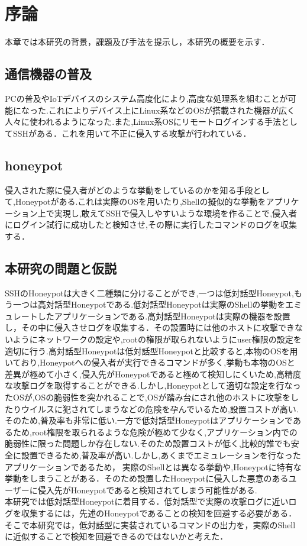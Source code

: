 \chapter{序論}
\label{intr}

本章では本研究の背景，課題及び手法を提示し，本研究の概要を示す．

\section{通信機器の普及}
\label{intr:back}
PCの普及やIoTデバイスのシステム高度化により,高度な処理系を組むことが可能になった.これによりデバイス上にLinux系などのOSが搭載された機器が広く人々に使われるようになった.また,Linux系OSにリモートログインする手法としてSSHがある．これを用いて不正に侵入する攻撃が行われている．

\section{honeypot}
\label{intr:honey}
 侵入された際に侵入者がどのような挙動をしているのかを知る手段として,Honeypotがある.これは実際のOSを用いたり,Shellの擬似的な挙動をアプリケーション上で実現し,敢えてSSHで侵入しやすいような環境を作ることで,侵入者にログイン試行に成功したと検知させ,その際に実行したコマンドのログを収集する．

 \section{本研究の問題と仮説}
 \label{intr:prob}
 SSHのHoneypotは大きく二種類に分けることができ,一つは低対話型Honeypot,もう一つは高対話型Honeypotである.低対話型Honeypotは実際のShellの挙動をエミュレートしたアプリケーションである.高対話型Honeypotは実際の機器を設置し，その中に侵入させログを収集する．その設置時には 他のホストに攻撃できないようにネットワークの設定や,rootの権限が取られないようにuser権限の設定を適切に行う.高対話型Honeypotは低対話型Honeypotと比較すると,本物のOSを用いており,Honeypotへの侵入者が実行できるコマンドが多く,挙動も本物のOSと差異が極めて小さく,侵入先がHoneypotであると極めて検知しにくいため,高精度な攻撃ログを取得することができる.しかし,Honeypotとして適切な設定を行なったOSが,OSの脆弱性を突かれることで,OSが踏み台にされ他のホストに攻撃をしたりウイルスに犯されてしまうなどの危険を孕んでいるため,設置コストが高い.そのため,普及率も非常に低い\cite{HighIntHoney}.一方で低対話型Honeypotはアプリケーションであるため,root権限を取られるような危険が極めて少なく,アプリケーション内での脆弱性に限った問題しか存在しない.そのため設置コストが低く,比較的誰でも安全に設置できるため,普及率が高い.しかし,あくまでエミュレーションを行なったアプリケーションであるため，実際のShellとは異なる挙動や,Honeypotに特有な挙動をしまうことがある．そのため 設置したHoneypotに侵入した悪意のあるユーザーに侵入先がHoneypotであると検知されてしまう可能性がある.\\
 本研究では低対話型Honeypotに着目する．低対話型で実際の攻撃ログに近いログを収集するには，先述のHoneypotであることの検知を回避する必要がある．そこで本研究では，低対話型に実装されているコマンドの出力を，実際のShellに近似することで検知を回避できるのではないかと考えた． 


